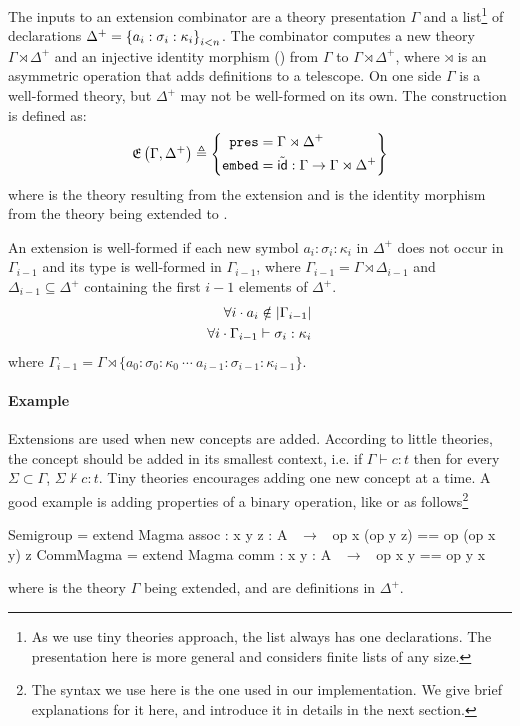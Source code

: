 The inputs to an extension combinator are a theory presentation $\Gamma$ and a list\footnote{As we use tiny theories approach, the list always has one declarations. The presentation here is more general and considers finite lists of any size.} of declarations $\Delta^+ = \left\{a_{i}:\sigma_{i}:\kappa_{i}\right\}_{i<n}$. 
The combinator computes a new theory $\Gamma\rtimes\Delta^+$ and an injective identity morphism () from $\Gamma$ to $\Gamma\rtimes\Delta^+$, where $\rtimes$ is an asymmetric operation that adds definitions to a telescope. On one side $\Gamma$ is a well-formed theory, but $\Delta^+$ may not be well-formed on its own. 
The construction is defined as: 
\[\mathfrak{E}\left(\Gamma, \Delta^+\right) \triangleq \left\{ \begin{aligned} \mathtt{pres} & = \Gamma \rtimes \Delta^+ \\ \mathtt{embed} & = \tilde{\mathsf{id}} : \Gamma \rightarrow \Gamma \rtimes \Delta^+ \end{aligned}\right\}\]
\noindent where  is the theory resulting from the extension and  is the identity morphism from the theory being extended to . 

An extension is well-formed if each new symbol $a_i:\sigma_{i}:\kappa_{i}$ in $\Delta^+$ does not occur in $\Gamma_{i-1}$ and its type is well-formed in $\Gamma_{i-1}$, 
where $\Gamma_{i-1} = \Gamma \rtimes \Delta_{i-1}$ and $\Delta_{i-1} \subseteq \Delta^+$ containing the first $i-1$ elements of $\Delta^+$.     
\begin{eqnarray*}
\forall i \cdot a_i \notin | \Gamma_{i-1} | \\
\forall i \cdot \Gamma_{i-1} \vdash \sigma_i : \kappa_{i}
\end{eqnarray*}
where $\Gamma_{i-1} = \Gamma \rtimes \{a_0 : \sigma_0 : \kappa_0\  \cdots \ a_{i-1} : \sigma_{i-1} : \kappa_{i-1}\}$.  


\paragraph{Example}
Extensions are used when new concepts are added. According to little theories, the concept should be added in its smallest context, i.e. if $\Gamma \vdash c : t$ then for every $\Sigma \subset \Gamma$, $\Sigma \nvdash c : t$. Tiny theories encourages adding one new concept at a time. A good example is adding properties of a binary operation, like  or  as follows\footnote{The syntax we use here is the one used in our implementation. We give brief explanations for it here, and introduce it in details in the next section.} 
\begin{togcode}
Semigroup = 
  extend Magma {assoc : {x y z : A} ~$\to$~ op x (op y z) == op (op x y) z} 
CommMagma = 
  extend Magma {comm  : {x y : A} ~$\to$~ op x y == op y x}
\end{togcode} 
\noindent where  is the theory $\Gamma$ being extended,  and  are definitions in $\Delta^+$. 


